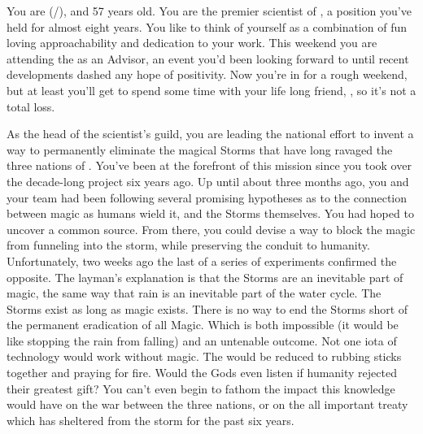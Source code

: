 \documentclass[char]{GL2020}
\begin{document}
\name{\cHeadScientist{}}


You are \cHeadScientist{\full} (\cHeadScientist{\they}/\cHeadScientist{\them}), and 57 years old.  You are the premier scientist of \pTech{\full}, a position you’ve held for almost eight years. You like to think of yourself as a combination of fun loving approachability and dedication to your work. This weekend you are attending the \pSchool{} as an Advisor, an event you’d been looking forward to until recent developments dashed any hope of positivity. Now you’re in for a rough weekend, but at least you’ll get to spend some time with your life long friend, \cChupInventor{}, so it’s not a total loss.

As the head of the \pTech{} scientist’s guild, you are leading the national effort to invent a way to permanently eliminate the magical Storms that have long ravaged the three nations of \pEarth{}.  You’ve been at the forefront of this mission since you took over the decade-long project six years ago. Up until about three months ago, you and your team had been following several promising hypotheses as to the connection between magic as humans wield it, and the Storms themselves. You had hoped to uncover a common source. From there, you could devise a way to block the magic from funneling into the storm, while preserving the conduit to humanity. Unfortunately, two weeks ago the last of a series of experiments confirmed the opposite. The layman's explanation is that the Storms are an inevitable part of magic, the same way that rain is an inevitable part of the water cycle. The Storms exist as long as magic exists. There is no way to end the Storms short of the permanent eradication of all Magic. Which is both impossible (it would be like stopping the rain from falling) and an untenable outcome. Not one iota of technology would work without magic. The \pTech{} would be reduced to rubbing sticks together and praying for fire. Would the Gods even listen if humanity rejected their greatest gift? You can’t even begin to fathom the impact this knowledge would have on the war between the three nations, or on the all important treaty which has sheltered \pTech{} from the storm for the past six years.  
\end{document}
